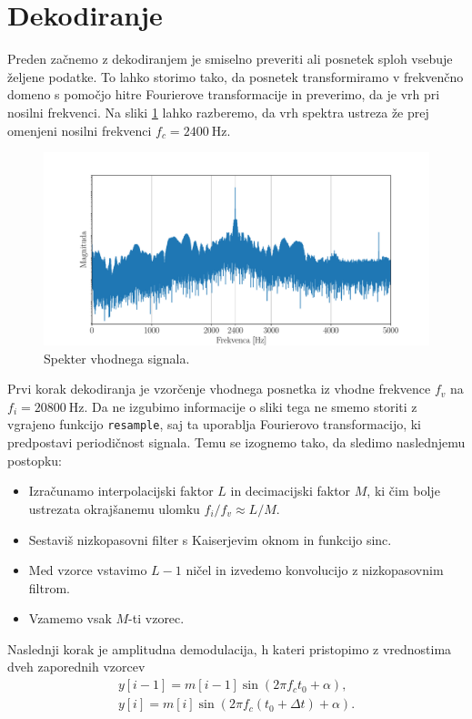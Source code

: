 \documentclass{article}
\begin{document}
\section{Dekodiranje}
Preden začnemo z dekodiranjem je smiselno preveriti ali posnetek sploh vsebuje željene podatke. To lahko storimo tako, da posnetek transformiramo v frekvenčno domeno s pomočjo hitre Fourierove transformacije in preverimo, da je vrh pri nosilni frekvenci. Na sliki \ref{fig:fft} lahko razberemo, da vrh spektra ustreza že prej omenjeni nosilni frekvenci $f_c=\SI{2400}{\hertz}$.
\begin{figure}[H]
    \centering
    \includegraphics[width=1\textwidth]{fft_plot.pdf}
    \caption{Spekter vhodnega signala.}
    \label{fig:fft}
\end{figure}
Prvi korak dekodiranja je vzorčenje vhodnega posnetka iz vhodne frekvence $f_v$ na $f_i=\SI{20800}{\hertz}$. Da ne izgubimo informacije o sliki tega ne smemo storiti z vgrajeno funkcijo \texttt{resample}, saj ta uporablja Fourierovo transformacijo, ki predpostavi periodičnost signala. Temu se izognemo tako, da sledimo naslednjemu postopku:
\begin{itemize}
  \item Izračunamo interpolacijski faktor $L$ in decimacijski faktor $M$, ki čim bolje ustrezata okrajšanemu ulomku $f_i/f_v\approx L/M$.
  \item Sestaviš nizkopasovni filter s Kaiserjevim oknom in funkcijo sinc.
  \item Med vzorce vstavimo $L-1$ ničel in izvedemo konvolucijo z nizkopasovnim filtrom.
  \item Vzamemo vsak $M$-ti vzorec.
\end{itemize}
Naslednji korak je amplitudna demodulacija, h kateri pristopimo z vrednostima dveh zaporednih vzorcev
\begin{align*}
	y[i-1] = m[i-1]\sin{(2\pi f_c t_0 + \alpha)}\text{,} \\
	y[i] = m[i]\sin{(2\pi f_c (t_0 + \Delta t) + \alpha)}\text{.}
\end{align*}
\end{document}
